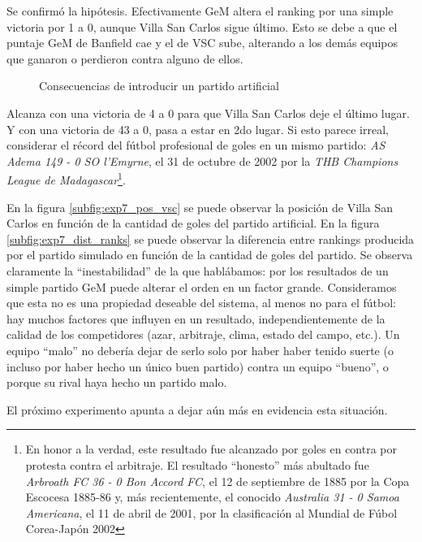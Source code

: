 \par Se confirmó la hipótesis. Efectivamente GeM altera el ranking por una
simple victoria por 1 a 0, aunque Villa San Carlos sigue último. Esto se debe a
que el puntaje GeM de Banfield cae y el de VSC sube, alterando a los demás
equipos que ganaron o perdieron contra alguno de ellos.

\begin{figure}[H]
    \caption{Consecuencias de introducir un partido artificial}
    \centering
    \hspace{2pt}
\end{figure}

\par Alcanza con una victoria de 4 a 0 para que Villa San Carlos deje el último
lugar. Y con una victoria de 43 a 0, pasa a estar en 2do lugar. Si esto parece
irreal, considerar el récord del fútbol profesional de goles en un mismo
partido: \emph{AS Adema 149 - 0 SO l'Emyrne}, el 31 de octubre de 2002 por la
\emph{THB Champions League de Madagascar}\footnote{En honor a la verdad, este
resultado fue alcanzado por goles en contra por protesta contra el arbitraje.
El resultado ``honesto'' más abultado fue \emph{Arbroath FC 36 - 0 Bon Accord
FC}, el 12 de septiembre de 1885 por la Copa Escocesa 1885-86 y, más
recientemente, el conocido \emph{Australia 31 - 0 Samoa Americana}, el 11 de
abril de 2001, por la clasificación al Mundial de Fúbol Corea-Japón 2002}.

\par En la figura \ref{subfig:exp7_pos_vsc} se puede observar la posición de
Villa San Carlos en función de la cantidad de goles del partido artificial. En
la figura \ref{subfig:exp7_dist_ranks} se puede observar la diferencia entre
rankings producida por el partido simulado en función de la cantidad de goles
del partido. Se observa claramente la ``inestabilidad'' de la que hablábamos:
por los resultados de un simple partido GeM puede alterar el orden en un factor
grande. Consideramos que esta no es una propiedad deseable del sistema, al
menos no para el fútbol: hay muchos factores que influyen en un resultado,
independientemente de la calidad de los competidores (azar, arbitraje, clima,
estado del campo, etc.). Un equipo ``malo'' no debería dejar de serlo solo por
haber haber tenido suerte (o incluso por haber hecho un único buen partido)
contra un equipo ``bueno'', o porque su rival haya hecho un partido malo.

\par El próximo experimento apunta a dejar aún más en evidencia esta situación.
